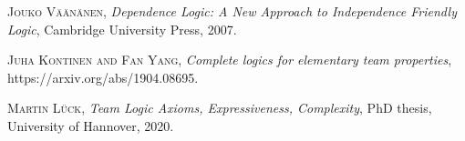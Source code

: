 \documentclass[bsl,meeting]{asl}
\begin{document}
%
\begin{thebibliography}{10}


{\scshape Jouko V\"a\"an\"anen},
{\itshape Dependence Logic: A New Approach to Independence Friendly Logic},
Cambridge University Press,
2007.



{\scshape Juha Kontinen and Fan Yang},
{\itshape Complete logics for elementary team properties},
https://arxiv.org/abs/1904.08695.


{\scshape Martin Lück},
{\itshape Team Logic
Axioms, Expressiveness, Complexity},
PhD thesis,
University of Hannover,
2020.


%
\end{thebibliography}


\vspace*{-0.5\baselineskip}
\end{document}

